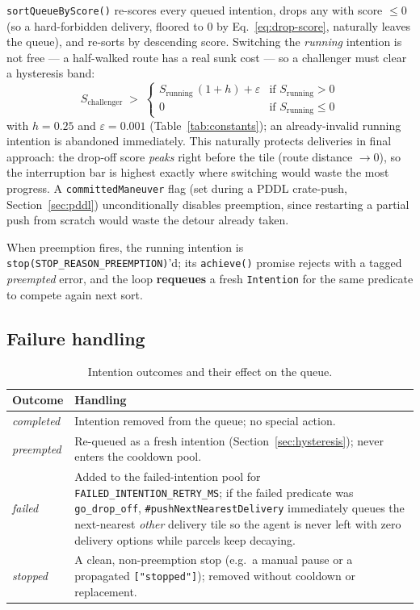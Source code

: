 \documentclass[11pt,a4paper]{article}
\begin{document}
\texttt{sortQueueByScore()} re-scores every queued intention, drops any with score $\leq 0$ (so
a hard-forbidden delivery, floored to 0 by Eq.~\ref{eq:drop-score}, naturally leaves the queue),
and re-sorts by descending score. Switching the \emph{running} intention is not free --- a
half-walked route has a real sunk cost --- so a challenger must clear a hysteresis band:
\begin{equation}
S_{\text{challenger}} \;>\;
\begin{cases}
S_{\text{running}}\,(1+h) + \varepsilon & \text{if } S_{\text{running}} > 0 \\
0 & \text{if } S_{\text{running}} \leq 0
\end{cases}
\label{eq:hysteresis}
\end{equation}
with $h=0.25$ and $\varepsilon=0.001$ (Table~\ref{tab:constants}); an already-invalid running
intention is abandoned immediately. This naturally protects deliveries in final approach: the
drop-off score \emph{peaks} right before the tile (route distance $\to 0$), so the interruption
bar is highest exactly where switching would waste the most progress. A
\texttt{committedManeuver} flag (set during a PDDL crate-push, Section~\ref{sec:pddl})
unconditionally disables preemption, since restarting a partial push from scratch would waste
the detour already taken.

When preemption fires, the running intention is \texttt{stop(STOP\_REASON\_PREEMPTION)}'d; its
\texttt{achieve()} promise rejects with a tagged \emph{preempted} error, and the loop
\textbf{requeues} a fresh \texttt{Intention} for the same predicate to compete again next sort.

\subsection{Failure handling}
\label{sec:failure}

\begin{table}[htbp]
\centering
\footnotesize
\begin{tabular}{@{}p{2.4cm}p{9.9cm}@{}}
\toprule
\textbf{Outcome} & \textbf{Handling} \\
\midrule
\textit{completed} & Intention removed from the queue; no special action. \\
\textit{preempted} & Re-queued as a fresh intention (Section~\ref{sec:hysteresis}); never enters the cooldown pool. \\
\textit{failed} & Added to the failed-intention pool for \texttt{FAILED\_INTENTION\_RETRY\_MS}; if the failed predicate was \texttt{go\_drop\_off}, \texttt{\#pushNextNearestDelivery} immediately queues the next-nearest \emph{other} delivery tile so the agent is never left with zero delivery options while parcels keep decaying. \\
\textit{stopped} & A clean, non-preemption stop (e.g.\ a manual pause or a propagated \texttt{["stopped"]}); removed without cooldown or replacement. \\
\bottomrule
\end{tabular}
\caption{Intention outcomes and their effect on the queue.}
\label{tab:outcomes}
\end{table}
\end{document}
